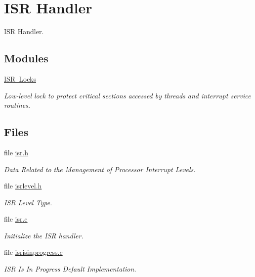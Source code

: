 \hypertarget{group__RTEMSScoreISR}{}\section{I\+SR Handler}
\label{group__RTEMSScoreISR}


I\+SR Handler.  


\subsection*{Modules}
\begin{DoxyCompactItemize}
\item 
\mbox{\hyperlink{group__RTEMSScoreISRLocks}{I\+S\+R Locks}}
\begin{DoxyCompactList}\small\item\em Low-\/level lock to protect critical sections accessed by threads and interrupt service routines. \end{DoxyCompactList}\end{DoxyCompactItemize}
\subsection*{Files}
\begin{DoxyCompactItemize}
\item 
file \mbox{\hyperlink{isr_8h}{isr.\+h}}
\begin{DoxyCompactList}\small\item\em Data Related to the Management of Processor Interrupt Levels. \end{DoxyCompactList}\item 
file \mbox{\hyperlink{isrlevel_8h}{isrlevel.\+h}}
\begin{DoxyCompactList}\small\item\em I\+SR Level Type. \end{DoxyCompactList}\item 
file \mbox{\hyperlink{isr_8c}{isr.\+c}}
\begin{DoxyCompactList}\small\item\em Initialize the I\+SR handler. \end{DoxyCompactList}\item 
file \mbox{\hyperlink{isrisinprogress_8c}{isrisinprogress.\+c}}
\begin{DoxyCompactList}\small\item\em I\+SR Is In Progress Default Implementation. \end{DoxyCompactList}\end{DoxyCompactItemize}
